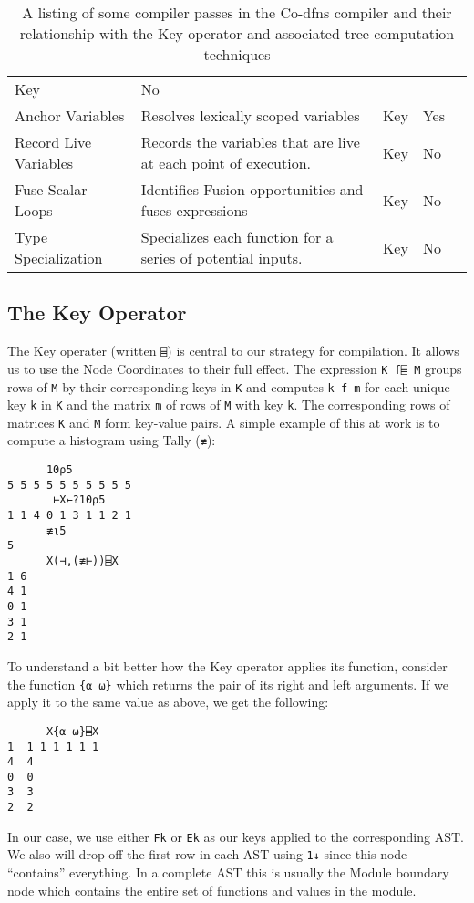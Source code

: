 \documentclass[numbers,preprint]{sigplanconf}
\begin{document}
\begin{table*}
\begin{tabular}{l p{2.8in} l l l}
 Key & No \\
Anchor Variables & Resolves lexically scoped variables &
 Key & Yes \\
Record Live Variables & Records the variables that are live at each point of 
 execution. & Key & No \\
Fuse Scalar Loops & Identifies Fusion opportunities and fuses expressions &
 Key & No \\
Type Specialization & Specializes each function for a series of potential inputs. 
 & Key & No \\
\end{tabular}
\caption{A listing of some compiler passes in the Co-dfns compiler and their 
 relationship with the Key operator and associated tree computation techniques}
\label{tab:passes}
\end{table*}

\subsection{The Key Operator}

The Key operater (written \verb;⌸;) is central to our strategy for compilation.
It allows us to use the Node Coordinates to their full effect. 
The expression \verb;K f⌸ M; groups rows of \verb;M; by their corresponding 
keys in \verb;K; and computes \verb;k f m; for each unique key \verb;k; in 
\verb;K; and the matrix \verb;m; of rows of \verb;M; with key \verb;k;. 
The corresponding rows of matrices \verb;K; and \verb;M; form key-value pairs.
A simple example of this at work is to compute a histogram using Tally (\verb;≢;):

\begin{verbatim}
      10⍴5
5 5 5 5 5 5 5 5 5 5
       ⊢X←?10⍴5
1 1 4 0 1 3 1 1 2 1
      ≢⍳5
5
      X(⊣,(≢⊢))⌸X
1 6
4 1
0 1
3 1
2 1
\end{verbatim}

To understand a bit better how the Key operator applies its function,
consider the function \verb;{⍺ ⍵}; which returns the pair of its right
and left arguments. If we apply it to the same value as above, we
get the following:

\begin{verbatim}
      X{⍺ ⍵}⌸X
1  1 1 1 1 1 1 
4  4           
0  0           
3  3           
2  2
\end{verbatim}

In our case, we use either \verb;Fk; or \verb;Ek; as our keys applied to the
corresponding AST. We also will drop off the first row in each AST
using \verb;1↓; since this node ``contains'' everything. In a complete
AST this is usually the Module boundary node which contains the entire
set of functions and values in the module.
\end{document}
